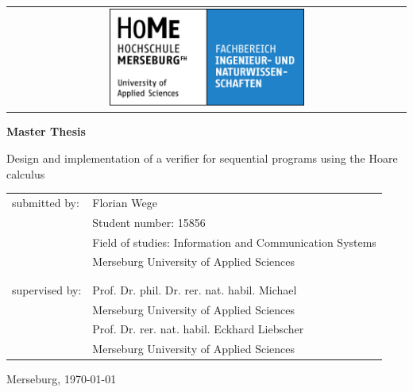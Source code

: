 \titlepage
\begin{titlepage}

\vspace*{1cm}

\begin{center}
	\begin{tabular}{c}
		\includegraphics[width=0.5\textwidth]{img/logo_fb1}
	\end{tabular}
\end{center}

\vfill

\begin{center}
\textbf{\Large{}Master Thesis}
\par\end{center}{\Large \par}

\begin{center}
{\large{}Design and implementation of a verifier for sequential programs
using the Hoare calculus}
\par\end{center}{\large \par}

\begin{flushleft}
{\Large{}\vfill
}
\par\end{flushleft}{\Large \par}

\begin{tabular}{ll}
	submitted by:\hspace{1cm} & Florian Wege \\
 	& Student number: 15856 \\
 	& Field of studies: Information and Communication Systems \\
 	& Merseburg University of Applied Sciences \\
 	\\
	\\
	supervised by: & Prof. Dr. phil. Dr. rer. nat. habil. Michael  \\
 	& Merseburg University of Applied Sciences \\
	& Prof. Dr. rer. nat. habil. Eckhard Liebscher \\
	& Merseburg University of Applied Sciences \\
\end{tabular}

\vspace*{1cm}

Merseburg, \today

\end{titlepage}

